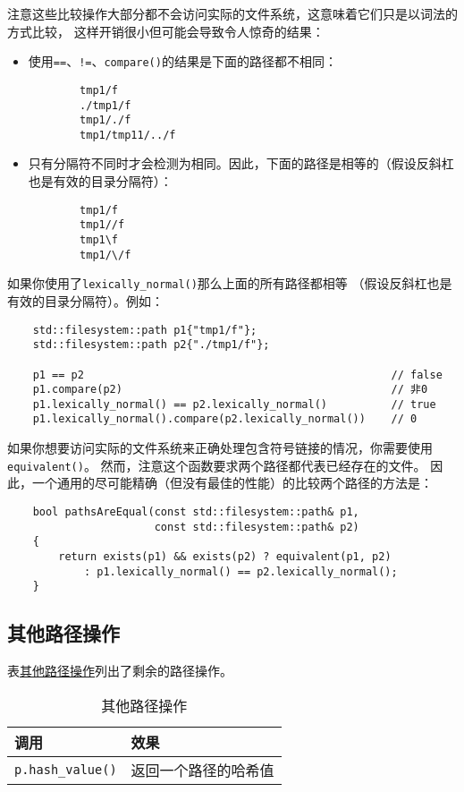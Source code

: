 注意这些比较操作大部分都不会访问实际的文件系统，这意味着它们只是以词法的方式比较，
这样开销很小但可能会导致令人惊奇的结果：
\begin{itemize}
    \item 使用\texttt{==}、\texttt{!=}、\texttt{compare()}的结果是下面的路径都不相同：
    \begin{lstlisting}
        tmp1/f
        ./tmp1/f
        tmp1/./f
        tmp1/tmp11/../f
    \end{lstlisting}
    \item 只有分隔符不同时才会检测为相同。因此，下面的路径是相等的（假设反斜杠也是有效的目录分隔符）：
    \begin{lstlisting}
        tmp1/f
        tmp1//f
        tmp1\f
        tmp1/\/f
    \end{lstlisting}
\end{itemize}
如果你使用了\texttt{lexically\_normal()}那么上面的所有路径都相等
（假设反斜杠也是有效的目录分隔符）。例如：
\begin{lstlisting}
    std::filesystem::path p1{"tmp1/f"};
    std::filesystem::path p2{"./tmp1/f"};

    p1 == p2                                                // false
    p1.compare(p2)                                          // 非0
    p1.lexically_normal() == p2.lexically_normal()          // true
    p1.lexically_normal().compare(p2.lexically_normal())    // 0
\end{lstlisting}
如果你想要访问实际的文件系统来正确处理包含符号链接的情况，你需要使用\texttt{equivalent()}。
然而，注意这个函数要求两个路径都代表已经存在的文件。
因此，一个通用的尽可能精确（但没有最佳的性能）的比较两个路径的方法是：
\begin{lstlisting}
    bool pathsAreEqual(const std::filesystem::path& p1,
                       const std::filesystem::path& p2)
    {
        return exists(p1) && exists(p2) ? equivalent(p1, p2)
            : p1.lexically_normal() == p2.lexically_normal();
    }
\end{lstlisting}

\subsection{其他路径操作}
表\hyperref[t20.9]{其他路径操作}列出了剩余的路径操作。
\begin{table}[htb]
    \centering
    \begin{tabular}{l|l}
        \hline
        \textbf{调用}              & \textbf{效果} \\
        \hline
        \texttt{p.hash\_value()} & 返回一个路径的哈希值  \\
        \hline
    \end{tabular}
    \caption{其他路径操作}
    \label{t20.9}
\end{table}

